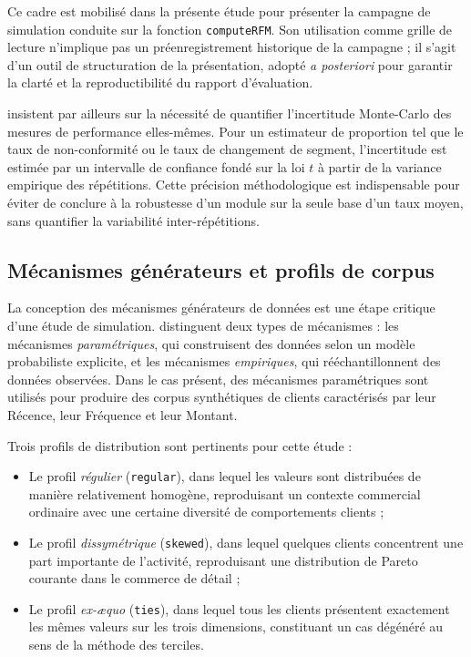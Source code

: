 Ce cadre est mobilisé dans la présente étude pour présenter la campagne de simulation
conduite sur la fonction \texttt{computeRFM}. Son utilisation comme grille de lecture
n'implique pas un préenregistrement historique de la campagne ; il s'agit d'un outil
de structuration de la présentation, adopté \emph{a posteriori} pour garantir la clarté
et la reproductibilité du rapport d'évaluation.

\citet{Morris2019} insistent par ailleurs sur la nécessité de quantifier l'incertitude
Monte-Carlo des mesures de performance elles-mêmes. Pour un estimateur de proportion tel
que le taux de non-conformité ou le taux de changement de segment, l'incertitude est
estimée par un intervalle de confiance fondé sur la loi $t$ à partir de la variance
empirique des répétitions. Cette précision méthodologique est indispensable pour éviter de
conclure à la robustesse d'un module sur la seule base d'un taux moyen, sans quantifier
la variabilité inter-répétitions.

\subsection{Mécanismes générateurs et profils de corpus}
\label{subsec:revue-simulation-dgm}

La conception des mécanismes générateurs de données est une étape critique d'une étude de
simulation. \citet{Morris2019} distinguent deux types de mécanismes : les mécanismes
\emph{paramétriques}, qui construisent des données selon un modèle probabiliste explicite,
et les mécanismes \emph{empiriques}, qui rééchantillonnent des données observées. Dans le
cas présent, des mécanismes paramétriques sont utilisés pour produire des corpus synthétiques
de clients caractérisés par leur Récence, leur Fréquence et leur Montant.

Trois profils de distribution sont pertinents pour cette étude :

\begin{itemize}
  \item Le profil \emph{régulier} (\texttt{regular}), dans lequel les valeurs sont
    distribuées de manière relativement homogène, reproduisant un contexte commercial
    ordinaire avec une certaine diversité de comportements clients ;
  \item Le profil \emph{dissymétrique} (\texttt{skewed}), dans lequel quelques clients
    concentrent une part importante de l'activité, reproduisant une distribution de Pareto
    courante dans le commerce de détail ;
  \item Le profil \emph{ex-æquo} (\texttt{ties}), dans lequel tous les clients présentent
    exactement les mêmes valeurs sur les trois dimensions, constituant un cas dégénéré au
    sens de la méthode des terciles.
\end{itemize}

